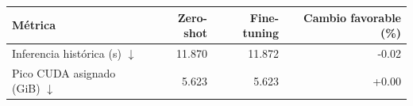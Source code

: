 \documentclass[10pt,a4paper]{article}
\begin{document}
\vspace{2mm}
\begingroup\small
\begin{tabularx}{\textwidth}{@{}LRRR@{}}
\toprule
\textbf{Métrica} & \textbf{Zero-shot} & \textbf{Fine-tuning} & \textbf{Cambio favorable (\%)} \\
\midrule
Inferencia histórica (s) \(\downarrow\) & 11.870 & 11.872 & -0.02 \\
Pico CUDA asignado (GiB) \(\downarrow\) & 5.623 & 5.623 & +0.00 \\
\bottomrule
\end{tabularx}
\endgroup
\vspace{6mm}
\end{document}
